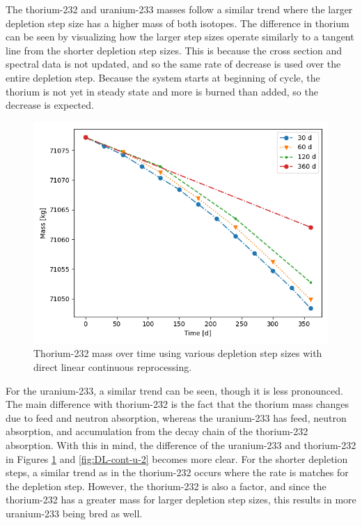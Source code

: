 The thorium-232 and uranium-233 masses follow a similar trend where the larger depletion step size has a higher mass of both isotopes. The difference in thorium can be seen by visualizing how the larger step sizes operate similarly to a tangent line from the shorter depletion step sizes. This is because the cross section and spectral data is not updated, and so the same rate of decrease is used over the entire depletion step. Because the system starts at beginning of cycle, the thorium is not yet in steady state and more is burned than added, so the decrease is expected.

\begin{figure}[H]
  \centering
  \includegraphics[scale=0.7]{images/DL_NSTEP_Th-232_mass-large.png}
  \caption{Thorium-232 mass over time using various depletion step sizes with direct linear continuous reprocessing.}
   \label{fig:DL-cont-th-2}
\end{figure}

For the uranium-233, a similar trend can be seen, though it is less pronounced. The main difference with thorium-232 is the fact that the thorium mass changes due to feed and neutron absorption, whereas the uranium-233 has feed, neutron absorption, and accumulation from the decay chain of the thorium-232 absorption. With this in mind, the difference of the uranium-233 and thorium-232 in Figures \ref{fig:DL-cont-th-2} and \ref{fig:DL-cont-u-2} becomes more clear. For the shorter depletion steps, a similar trend as in the thorium-232 occurs where the rate is matches for the depletion step. However, the thorium-232 is also a factor, and since the thorium-232 has a greater mass for larger depletion step sizes, this results in more uranium-233 being bred as well.

